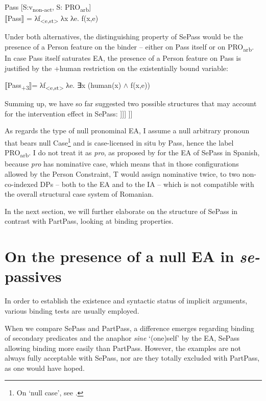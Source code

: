 \documentclass[output=paper]{langsci/langscibook}
\begin{document}
\ea%
    Pass [S:v\textsubscript{non-act}, S: PRO\textsubscript{arb}]\label{ex:giurgea:38}\\
  ⟦Pass⟧ = λf\textsubscript{<e,st>} λx λe. f(x,e)
\z
 
Under both alternatives, the distinguishing property of SePass would be the presence of a Person feature on the binder – either on Pass itself or on PRO\textsubscript{arb}. In case Pass itself saturates EA, the presence of a Person feature on Pass is justified by the +human restriction on the existentially bound variable:

\ea%
    \label{ex:giurgea:39}
⟦Pass\textsubscript{+3}⟧= λf\textsubscript{<e,st>} λe. ∃x (human(x) $\wedge$ f(x,e))
\z

Summing up, we have so far suggested two possible structures that may account for the intervention effect in SePass:
% 
\ea%
    \label{ex:giurgea:40}
    \ea\relax [\textsubscript{PassP} PRO\textsubscript{arb}\textsubscript{+Person} [Pass [\textit{\textsubscript{v}}\textsubscript{P} \textit{v} [\textsubscript{VP} V IA]]]]
    \ex\relax [\textsubscript{PassP} Pass\textsubscript{+Person} [\textit{\textsubscript{v}}\textsubscript{P} \textit{v} [\textsubscript{VP} V IA]]]
    \z
\z 

As regards the type of null pronominal EA, I assume a null arbitrary pronoun that bears null Case\footnote{On ‘null case', see \citet{Chomsky1993,Bošković1995,Bošković1997,Martin2001}.}  and is case-licensed in situ by Pass, hence the label PRO\textsubscript{arb}. I do not treat it as \textit{pro}, as proposed by \citet{MacDonald2017} for the EA of SePass in Spanish, because \textit{pro} has nominative case, which means that in those configurations allowed by the Person Constraint, T would assign nominative twice, to two non-co-indexed DPs – both to the EA and to the IA – which is not compatible with the overall structural case system of Romanian.

In the next section, we will further elaborate on the structure of SePass in contrast with PartPass, looking at binding properties.

\section{On the presence of a null EA in \textit{se-}passives}%
 
In order to establish the existence and syntactic status of implicit arguments, various binding tests are usually employed.
 
When we compare SePass and PartPass, a difference emerges regarding binding of secondary predicates and the anaphor \textit{sine} ‘(one)self’ by the EA, SePass allowing binding more easily than PartPass. However, the examples are not always fully acceptable with SePass, nor are they totally excluded with PartPass, as one would have hoped.
 
\end{document}
